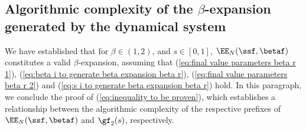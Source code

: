 
\subsection{\texorpdfstring{Algorithmic complexity of the $\beta$-expansion generated by the dynamical system}{}}

We have established that for $\beta \in (1,2)$, and $s \in [0,1]$, $\EE_N(\ssf,\betaf)$ constitutes a valid $\beta$-expansion, assuming that (\ref{eq:final value parameters beta r 1}), (\ref{eq:beta i to generate beta expansion beta r}), (\ref{eq:final value parameters beta r 2}) and  (\ref{eq:s i to generate beta expansion beta r}) hold. In this paragraph, we conclude the proof of (\ref{eq:inequality to be proven}), which establishes a relationship between the algorithmic complexity of the respective prefixes of $\EE_N(\ssf,\betaf)$ and $\gf_2(s)$, respectively.

